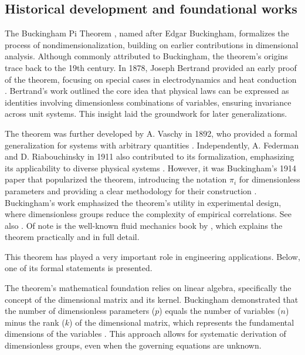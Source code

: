 \subsection{Historical development and foundational works}

The Buckingham Pi Theorem \cite{buckingham1914}, named after Edgar Buckingham, formalizes the process of nondimensionalization, building on earlier contributions in dimensional analysis. Although commonly attributed to Buckingham, the theorem's origins trace back to the 19th century. In 1878, Joseph Bertrand provided an early proof of the theorem, focusing on special cases in electrodynamics and heat conduction \cite{Bertrand1878}. Bertrand's work outlined the core idea that physical laws can be expressed as identities involving dimensionless combinations of variables, ensuring invariance across unit systems. This insight laid the groundwork for later generalizations.

The theorem was further developed by A. Vaschy in 1892, who provided a formal generalization for systems with arbitrary quantities \cite{vaschy1892}. Independently, A. Federman and D. Riabouchinsky in 1911 also contributed to its formalization, emphasizing its applicability to diverse physical systems \cite{Federman1911, Riabouchinsky1911}. However, it was Buckingham's 1914 paper that popularized the theorem, introducing the notation \(\pi_i\) for dimensionless parameters and providing a clear methodology for their construction \cite{buckingham1914}. Buckingham's work emphasized the theorem's utility in experimental design, where dimensionless groups reduce the complexity of empirical correlations. See also \cite{Bridgman1922}. Of note is the well-known fluid mechanics book by \cite{white2011}, which explains the theorem practically and in full detail.

This theorem has played a very important role in engineering applications. Below, one of its formal statements is presented.

The theorem's mathematical foundation relies on linear algebra, specifically the concept of the dimensional matrix and its kernel. Buckingham demonstrated that the number of dimensionless parameters (\( p \)) equals the number of variables (\( n \)) minus the rank (\( k \)) of the dimensional matrix, which represents the fundamental dimensions of the variables \cite{buckingham1914}. This approach allows for systematic derivation of dimensionless groups, even when the governing equations are unknown.

